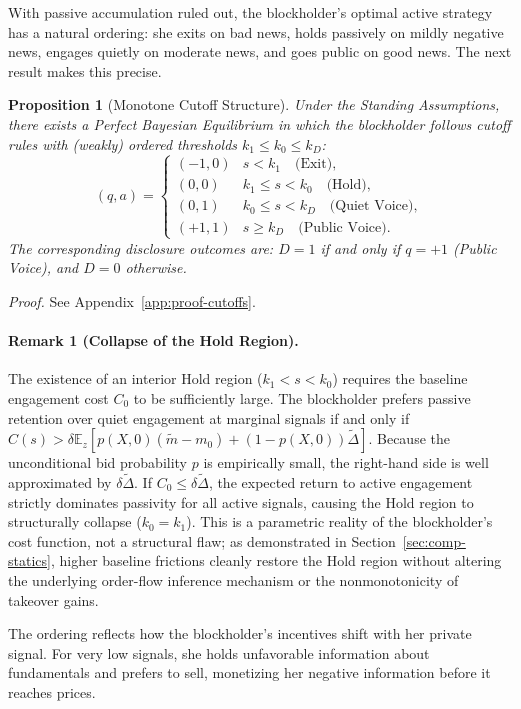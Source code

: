 \documentclass[11pt]{article}
\newtheorem{proposition}{Proposition}
\newcommand{\E}{\mathbb{E}}
\newcommand{\1}{\mathbf{1}}
\begin{document}
With passive accumulation ruled out, the blockholder's optimal active strategy has a natural ordering: she exits on bad news, holds passively on mildly negative news, engages quietly on moderate news, and goes public on good news. The next result makes this precise.

\begin{proposition}[Monotone Cutoff Structure]
\label{prop:cutoffs}
Under the Standing Assumptions, there exists a Perfect Bayesian Equilibrium in which the blockholder follows cutoff rules with (weakly) ordered thresholds $k_1 \leq k_0 \leq k_D$:
\[
(q, a) = \begin{cases}
(-1, 0) & s < k_1 \quad \text{(Exit)}, \\
(0, 0) & k_1 \leq s < k_0 \quad \text{(Hold)}, \\
(0, 1) & k_0 \leq s < k_D \quad \text{(Quiet Voice)}, \\
(+1, 1) & s \geq k_D \quad \text{(Public Voice)}.
\end{cases}
\]
The corresponding disclosure outcomes are: $D = 1$ if and only if $q = +1$ (Public Voice), and $D = 0$ otherwise.
\end{proposition}
\textit{Proof.} See Appendix~\ref{app:proof-cutoffs}.

\paragraph{Remark 1 (Collapse of the Hold Region).}
The existence of an interior Hold region ($k_1 < s < k_0$) requires the baseline engagement cost $C_0$ to be sufficiently large. The blockholder prefers passive retention over quiet engagement at marginal signals if and only if $C(s) > \delta \E_z[p(X,0)(\tilde{m}-m_0) + (1-p(X,0))\tilde{\Delta}]$. Because the unconditional bid probability $p$ is empirically small, the right-hand side is well approximated by $\delta \tilde{\Delta}$. If $C_0 \le \delta \tilde{\Delta}$, the expected return to active engagement strictly dominates passivity for all active signals, causing the Hold region to structurally collapse ($k_0 = k_1$). This is a parametric reality of the blockholder's cost function, not a structural flaw; as demonstrated in Section~\ref{sec:comp-statics}, higher baseline frictions cleanly restore the Hold region without altering the underlying order-flow inference mechanism or the nonmonotonicity of takeover gains.

The ordering reflects how the blockholder's incentives shift with her private signal. For very low signals, she holds unfavorable information about fundamentals and prefers to sell, monetizing her negative information before it reaches prices.
\end{document}
